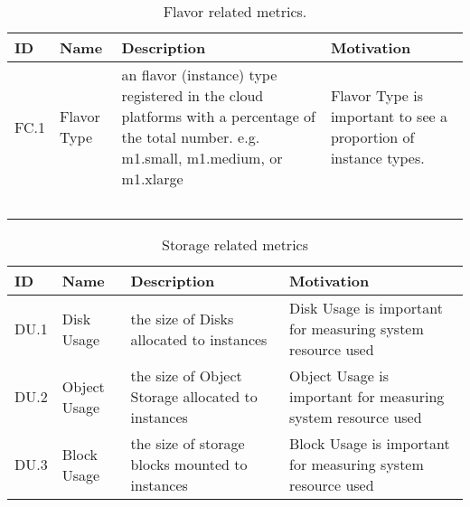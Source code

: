 \begin{table*}[P]
\caption{Flavor related metrics.}
\begin{scriptsize}
\label{T:metrics}
\bigskip
\begin{center}
\begin{tabular}{lp{}p{}p{}}
\hline
\rowcolor{blue!20} \bf ID & \bf Name & \bf Description & \bf Motivation \\
\hline 
FC.1 &
Flavor Type &
an flavor (instance) type registered in the cloud platforms with a
percentage of the total number. e.g. m1.small, m1.medium, or m1.xlarge & 
Flavor Type is important to see a proportion of instance types. \\
~\\
\hline
\end{tabular}
\end{center}
\end{scriptsize}
\end{table*}

\begin{table*}[P]
\caption{Storage related metrics}
\begin{scriptsize}
\label{T:metrics}
\bigskip
\begin{center}
\begin{tabular}{lp{}p{}p{}}
\hline
\rowcolor{blue!20}   \bf ID & \bf Name & \bf Description & \bf Motivation \\
\hline  
DU.1 &
Disk Usage &
the size of Disks allocated to instances &
Disk Usage is important for measuring system resource used \\
\hline
DU.2 &
Object Usage &
the size of Object Storage allocated to instances &
Object Usage is important for measuring system resource used \\
\hline
DU.3 &
Block Usage &
the size of storage blocks mounted to instances &
Block Usage is important for measuring system resource used \\
\hline
\end{tabular}
\end{center}
\end{scriptsize}
\end{table*}


